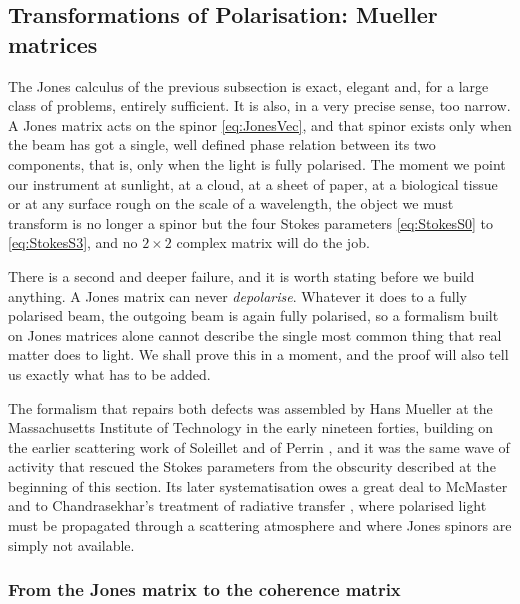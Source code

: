     \subsection{Transformations of Polarisation: Mueller matrices}

        The Jones calculus of the previous subsection is exact, elegant and, for a large class of problems, entirely sufficient. It is also, in a very precise sense, too narrow. A Jones matrix acts on the spinor \ref{eq:JonesVec}, and that spinor exists only when the beam has got a single, well defined phase relation between its two components, that is, only when the light is fully polarised. The moment we point our instrument at sunlight, at a cloud, at a sheet of paper, at a biological tissue or at any surface rough on the scale of a wavelength, the object we must transform is no longer a spinor but the four Stokes parameters \ref{eq:StokesS0} to \ref{eq:StokesS3}, and no $2\times2$ complex matrix will do the job.

        There is a second and deeper failure, and it is worth stating before we build anything. A Jones matrix can never \textit{depolarise}. Whatever it does to a fully polarised beam, the outgoing beam is again fully polarised, so a formalism built on Jones matrices alone cannot describe the single most common thing that real matter does to light. We shall prove this in a moment, and the proof will also tell us exactly what has to be added.

        The formalism that repairs both defects was assembled by Hans Mueller at the Massachusetts Institute of Technology in the early nineteen forties, building on the earlier scattering work of Soleillet and of Perrin \citep{perrin1942polarization}, and it was the same wave of activity that rescued the Stokes parameters from the obscurity described at the beginning of this section. Its later systematisation owes a great deal to McMaster \citep{mcmaster1954polarization} and to Chandrasekhar's treatment of radiative transfer \citep{chandrasekhar1950radiative}, where polarised light must be propagated through a scattering atmosphere and where Jones spinors are simply not available.

        \subsubsection{From the Jones matrix to the coherence matrix}

